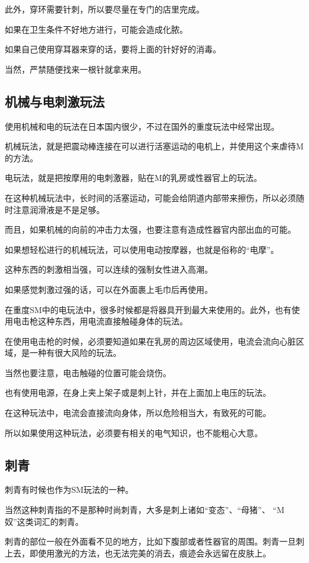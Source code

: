 \documentclass[12pt,UTF8]{ctexbook}
\begin{document}
此外，穿环需要针刺，所以要尽量在专门的店里完成。

如果在卫生条件不好地方进行，可能会造成化脓。

如果自己使用穿耳器来穿的话，要将上面的针好好的消毒。

当然，严禁随便找来一根针就拿来用。

\subsection{机械与电刺激玩法}

使用机械和电的玩法在日本国内很少，不过在国外的重度玩法中经常出现。

机械玩法，就是把震动棒连接在可以进行活塞运动的电机上，并使用这个来虐待M的方法。

电玩法，就是把按摩用的电刺激器，贴在M的乳房或性器官上的玩法。

在这种机械玩法中，长时间的活塞运动，可能会给阴道内部带来擦伤，所以必须随时注意润滑液是不是足够。

而且，如果机械的向前的冲击力太强，也要注意有造成性器官内部出血的可能。

如果想轻松进行的机械玩法，可以使用电动按摩器，也就是俗称的“电摩”。

这种东西的刺激相当强，可以连续的强制女性进入高潮。

如果感觉刺激过强的话，可以在外面裹上毛巾后再使用。

在重度SM中的电玩法中，很多时候都是将器具开到最大来使用的。此外，也有使用电击枪这种东西，用电流直接触碰身体的玩法。

在使用电击枪的时候，必须要知道如果在乳房的周边区域使用，电流会流向心脏区域，是一种有很大风险的玩法。

当然也要注意，电击触碰的位置可能会烧伤。

也有使用电源，在身上夹上架子或是刺上针，并在上面加上电压的玩法。

在这种玩法中，电流会直接流向身体，所以危险相当大，有致死的可能。

所以如果使用这种玩法，必须要有相关的电气知识，也不能粗心大意。

\subsection{刺青}

刺青有时候也作为SM玩法的一种。

当然这种刺青指的不是那种时尚刺青，大多是刺上诸如“变态”、“母猪”、 “M奴”这类词汇的刺青。

刺青的部位一般在外面看不见的地方，比如下腹部或者性器官的周围。刺青一旦刺上去，即使用激光的方法，也无法完美的消去，痕迹会永远留在皮肤上。
\end{document}
